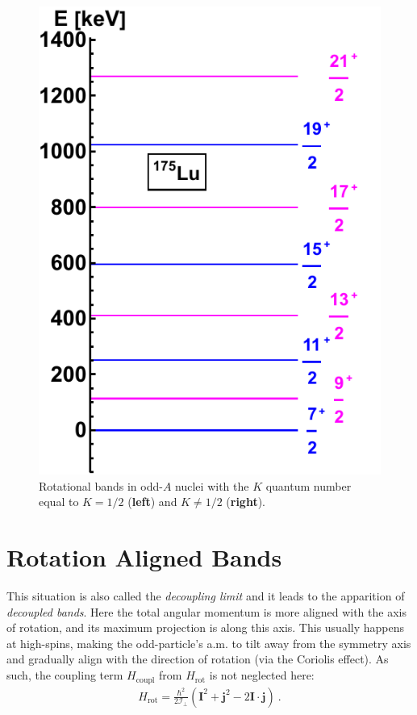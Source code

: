 \begin{figure}
    \includegraphics[scale=0.7]{Chapters/Figures/Lu175-Rotational-Bands.pdf}
    \caption{Rotational bands in odd-$A$ nuclei with the $K$ quantum number equal to $K=1/2$ (\textbf{left}) and $K\neq 1/2$ (\textbf{right}).}
    \label{rotational-bands-odd-a}
\end{figure}

\section{Rotation Aligned Bands}
\label{section-ral-signature}
This situation is also called the \emph{decoupling limit} \cite{bohr1998nuclear} and it leads to the apparition of \emph{decoupled bands}. Here the total angular momentum is more aligned with the axis of rotation, and its maximum projection is along this axis. This usually happens at high-spins, making the odd-particle's a.m. to tilt away from the symmetry axis and gradually align with the direction of rotation (via the Coriolis effect). As such, the coupling term $H_\text{coupl}$ from $H_\text{rot}$ is not neglected here:
\begin{align}
    H_\text{rot}=\frac{\hbar^2}{2\mathcal{I}_\perp}\left(\mathbf{I}^2+\mathbf{j}^2-2\mathbf{I}\cdot\mathbf{j}\right)\ .
\end{align}

